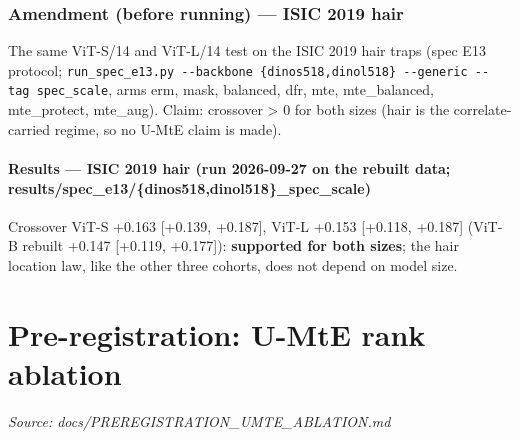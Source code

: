 {\subsubsection{Amendment (before running) --- ISIC 2019 hair}\label{amendment-before-running--isic-2019-hair}

The same ViT-S/14 and ViT-L/14 test on the ISIC 2019 hair traps (spec E13 protocol; \texttt{run\_spec\_e13.py\ -\/-backbone\ \{dinos518,dinol518\}\ -\/-generic\ -\/-tag\ spec\_scale}, arms erm, mask, balanced, dfr, mte, mte\_balanced, mte\_protect,
mte\_aug). Claim: crossover \textgreater{} 0 for both sizes (hair is the correlate-carried regime, so no U-MtE claim is made).

\paragraph{Results --- ISIC 2019 hair (run 2026-09-27 on the rebuilt data; results/spec\_e13/\{dinos518,dinol518\}\_spec\_scale)}\label{results--isic-2019-hair-run-2026-09-27-on-the-rebuilt-data-resultsspec_e13dinos518dinol518_spec_scale}

Crossover ViT-S +0.163 {[}+0.139, +0.187{]}, ViT-L +0.153 {[}+0.118, +0.187{]} (ViT-B rebuilt +0.147 {[}+0.119, +0.177{]}):
\textbf{supported for both sizes}; the hair location law, like the other three cohorts, does not depend on model size.

}

\section{Pre-registration: U-MtE rank ablation}\label{doc:PREREGISTRATION_UMTE_ABLATION}
\noindent\textit{Source: docs/PREREGISTRATION\_UMTE\_ABLATION.md}

